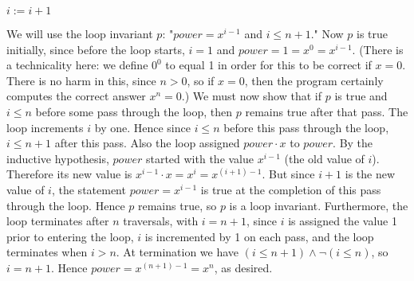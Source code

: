 \documentclass[11pt]{article}
\begin{document}
\begin{enumerate}[label=\textbf{\arabic*.}]
	\qquad\qquad $i := i + 1$
	
	We will use the loop invariant $p$: "$power = x^{i - 1}$ and $i \leq n + 1$." Now $p$ is true initially, since before the loop starts, $i = 1$ and $power = 1 = x^0 = x^{i - 1}$. (There is a technicality here: we define $0^0$ to equal 1 in order for this to be correct if $x = 0$. There is no harm in this, since $n > 0$, so if $x = 0$, then the program certainly computes the correct answer $x^n = 0$.) We must now show that if $p$ is true and $i \leq n$ before some pass through the loop, then $p$ remains true after that pass. The loop increments $i$ by one. Hence since $i \leq n$ before this pass through the loop, $i \leq n + 1$ after this pass. Also the loop assigned $power \cdot x$ to $power$. By the inductive hypothesis, $power$ started with the value $x^{i - 1}$ (the old value of $i$). Therefore its new value is $x^{i - 1} \cdot x = x^i = x^{(i + 1) - 1}$. But since $i + 1$ is the new value of $i$, the statement $power = x^{i - 1}$ is true at the completion of this pass through the loop. Hence $p$ remains true, so $p$ is a loop invariant. Furthermore, the loop terminates after $n$ traversals, with $i = n + 1$, since $i$ is assigned the value 1 prior to entering the loop, $i$ is incremented by 1 on each pass, and the loop terminates when $i > n$. At termination we have $(i \leq n + 1) \land \neg(i \leq n)$, so $i = n + 1$. Hence $power = x^{(n + 1) - 1} = x^n$, as desired.
\end{enumerate}
\end{document}
